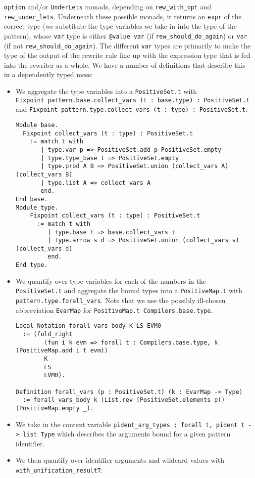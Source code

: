 \documentclass[
]{article}
\begin{document}
\begin{itemize}
\begin{itemize}
    \texttt{option} and/or \texttt{UnderLets} monads, depending on
    \texttt{rew\_with\_opt} and \texttt{rew\_under\_lets}. Underneath
    these possible monads, it returns an \texttt{expr} of the correct
    type (we substitute the type variables we take in into the type of
    the pattern), whose \texttt{var} type is either \texttt{@value\ var}
    (if \texttt{rew\_should\_do\_again}) or \texttt{var} (if not
    \texttt{rew\_should\_do\_again}). The different \texttt{var} types
    are primarily to make the type of the output of the rewrite rule
    line up with the expression type that is fed into the rewriter as a
    whole. We have a number of definitions that describe this in a
    dependently typed mess:

    \begin{itemize}
    \item
      We aggregate the type variables into a \texttt{PositiveSet.t} with
      \texttt{Fixpoint\ pattern.base.collect\_vars\ (t\ :\ base.type)\ :\ PositiveSet.t}
      and
      \texttt{Fixpoint\ pattern.type.collect\_vars\ (t\ :\ type)\ :\ PositiveSet.t}:

\begin{verbatim}
Module base.
  Fixpoint collect_vars (t : type) : PositiveSet.t
    := match t with
       | type.var p => PositiveSet.add p PositiveSet.empty
       | type.type_base t => PositiveSet.empty
       | type.prod A B => PositiveSet.union (collect_vars A) (collect_vars B)
       | type.list A => collect_vars A
       end.
End base.
Module type.
    Fixpoint collect_vars (t : type) : PositiveSet.t
      := match t with
         | type.base t => base.collect_vars t
         | type.arrow s d => PositiveSet.union (collect_vars s) (collect_vars d)
         end.
End type.
\end{verbatim}
    \item
      We quantify over type variables for each of the numbers in the
      \texttt{PositiveSet.t} and aggregate the bound types into a
      \texttt{PositiveMap.t} with \texttt{pattern.type.forall\_vars}.
      Note that we use the possibly ill-chosen abbreviation
      \texttt{EvarMap} for \texttt{PositiveMap.t\ Compilers.base.type}.

\begin{verbatim}
Local Notation forall_vars_body K LS EVM0
  := (fold_right
        (fun i k evm => forall t : Compilers.base.type, k (PositiveMap.add i t evm))
        K
        LS
        EVM0).

Definition forall_vars (p : PositiveSet.t) (k : EvarMap -> Type)
  := forall_vars_body k (List.rev (PositiveSet.elements p)) (PositiveMap.empty _).
\end{verbatim}
    \item
      We take in the context variable
      \texttt{pident\_arg\_types\ :\ forall\ t,\ pident\ t\ -\textgreater{}\ list\ Type}
      which describes the arguments bound for a given pattern
      identifier.
    \item
      We then quantify over identifier arguments and wildcard values
      with \texttt{with\_unification\_resultT}:


\end{itemize}
\end{itemize}
\end{itemize}
\end{document}
